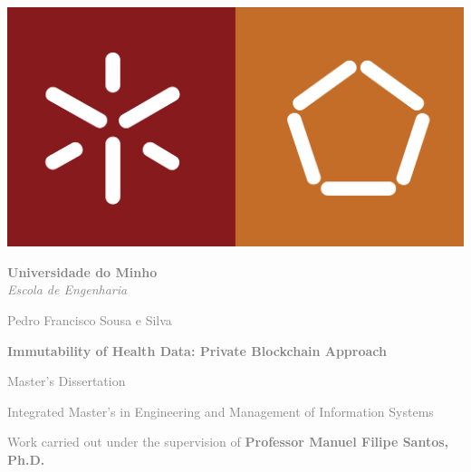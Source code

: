 \begin{titlepage}
\begin{center}

    \begin{minipage}{0.3\textwidth}
        \centering
        \includegraphics[width=\textwidth]{assets/title/symbol.jpg} 
        
        \vspace{0.5cm}

        \raggedright
        \textcolor{gray}{\textbf{Universidade do Minho}}\\
        \textcolor{gray}{\textit{Escola de Engenharia}} 

        \vspace{3cm}
        \begin{adjustwidth}{0cm}{-2cm}
        \textcolor{gray}{Pedro Francisco Sousa e Silva}
        \end{adjustwidth}
        
        \vspace{0.5cm}
        \begin{adjustwidth}{0cm}{-2cm}
        \textcolor{gray}{\textbf{Immutability of Health Data: Private Blockchain Approach}}
        \end{adjustwidth}
        
        \vspace{4cm}
        \begin{adjustwidth}{0cm}{-2cm}
        \textcolor{gray}{Master's Dissertation}
        \end{adjustwidth}
        
        \begin{adjustwidth}{0cm}{-2cm}
        \textcolor{gray}{Integrated Master's in Engineering and Management of Information Systems}
        \end{adjustwidth}
        \vspace{2cm}
        \begin{adjustwidth}{0cm}{-2cm}
        \textcolor{gray}{Work carried out under the supervision of
        \textbf{Professor Manuel Filipe Santos, Ph.D.}}
        \end{adjustwidth}
        

\end{minipage}
\end{center}
\end{titlepage}
